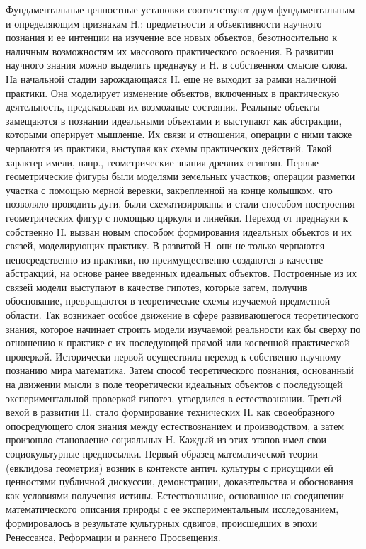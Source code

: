 \documentclass[a4paper,12pt]{article}
\begin{document}
Фундаментальные ценностные установки соответствуют двум фундаментальным и определяющим признакам Н.: предметности и объективности научного познания и ее интенции на изучение все новых объектов, безотносительно к наличным возможностям их массового практического освоения. 
В развитии научного знания можно выделить преднауку и Н. в собственном смысле слова. На начальной стадии зарождающаяся Н. еще не выходит за рамки наличной практики. Она моделирует изменение объектов, включенных в практическую деятельность, предсказывая их возможные состояния. Реальные объекты замещаются в познании идеальными объектами и выступают как абстракции, которыми оперирует мышление. Их связи и отношения, операции с ними также черпаются из практики, выступая как схемы практических действий. Такой характер имели, напр., геометрические знания древних египтян. Первые геометрические фигуры были моделями земельных участков; операции разметки участка с помощью мерной веревки, закрепленной на конце колышком, что позволяло проводить дуги, были схематизированы и стали способом построения геометрических фигур с помощью циркуля и линейки. 
Переход от преднауки к собственно Н. вызван новым способом формирования идеальных объектов и их связей, моделирующих практику. В развитой Н. они не только черпаются непосредственно из практики, но преимущественно создаются в качестве абстракций, на основе ранее введенных идеальных объектов. Построенные из их связей модели выступают в качестве гипотез, которые затем, получив обоснование, превращаются в теоретические схемы изучаемой предметной области. Так возникает особое движение в сфере развивающегося теоретического знания, которое начинает строить модели изучаемой реальности как бы сверху по отношению к практике с их последующей прямой или косвенной практической проверкой. 
Исторически первой осуществила переход к собственно научному познанию мира математика. Затем способ теоретического познания, основанный на движении мысли в поле теоретически идеальных объектов с последующей экспериментальной проверкой гипотез, утвердился в естествознании. Третьей вехой в развитии Н. стало формирование технических Н. как своеобразного опосредующего слоя знания между естествознанием и производством, а затем произошло становление социальных Н. 
Каждый из этих этапов имел свои социокультурные предпосылки. Первый образец математической теории (евклидова геометрия) возник в контексте антич. культуры с присущими ей ценностями публичной дискуссии, демонстрации, доказательства и обоснования как условиями получения истины. 
Естествознание, основанное на соединении математического описания природы с ее экспериментальным исследованием, формировалось в результате культурных сдвигов, происшедших в эпохи Ренессанса, Реформации и раннего Просвещения. 
\end{document}
